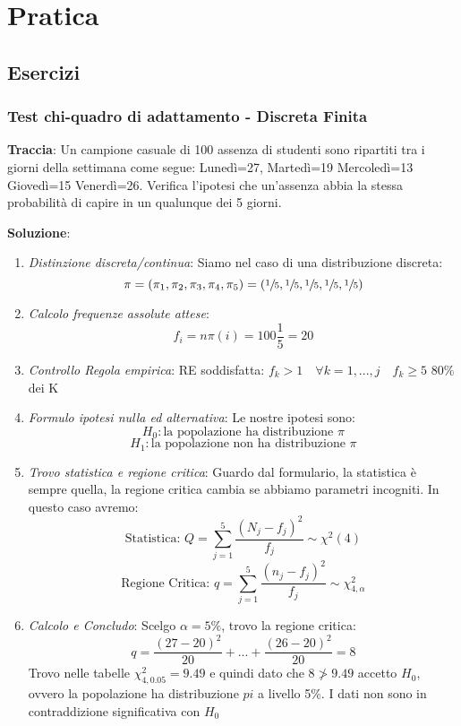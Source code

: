 \section{Pratica}

\subsection{Esercizi}

\subsubsection{Test chi-quadro di adattamento - Discreta Finita}

\textbf{Traccia}: Un campione casuale di 100 assenza di studenti sono ripartiti tra i giorni della settimana come segue: Lunedì=27, Martedì=19 Mercoledì=13 Giovedì=15 Venerdì=26. Verifica l'ipotesi che un'assenza abbia la stessa probabilità di capire in un qualunque dei 5 giorni. \n

\ind \textbf{Soluzione}: 
\begin{enumerate}
    \item \textit{Distinzione discreta/continua}: Siamo nel caso di una distribuzione discreta: $$ \pi = (\pi_1, \pi_2, \pi_3, \pi_4, \pi_5) = (\sfrac{1}{5}, \sfrac{1}{5}, \sfrac{1}{5}, \sfrac{1}{5}, \sfrac{1}{5}) $$
    \item \textit{Calcolo frequenze assolute attese}: $$f_i = n \pi(i) = 100 \frac{1}{5} = 20$$ 
    \item \textit{Controllo Regola empirica}: RE soddisfatta: $f_k > 1 \quad \forall k = 1, ..., j
    \quad f_k \geq 5$ 80\% dei K
    \item \textit{Formulo ipotesi nulla ed alternativa}: Le nostre ipotesi sono: $$H_0: \text{la popolazione ha distribuzione } \pi$$ $$H_1: \text{la popolazione non ha distribuzione }\pi$$
    \item \textit{Trovo statistica e regione critica}: Guardo dal formulario, la statistica è sempre quella, la regione critica cambia se abbiamo parametri incogniti. In questo caso avremo: $$\text{Statistica: } Q = \sum_{j=1}^5 \dfrac{(N_j - f_j)^2}{f_j} \sim \chi^2(4)$$ $$\text{Regione Critica: } q=\sum_{j=1}^5 \dfrac{(n_j - f_j)^2}{f_j} \sim \chi^2_{4, \alpha}  $$
    \item \textit{Calcolo e Concludo}: Scelgo $\alpha=5\%$, trovo la regione critica: $$q = \dfrac{(27 - 20)^2}{20} + ... + \dfrac{(26 - 20)^2}{20} = 8$$ Trovo nelle tabelle $\chi^2_{4, 0.05}=9.49$ e quindi dato che $8 \ngtr 9.49$ accetto $H_0$, ovvero la popolazione ha distribuzione $pi$ a livello 5\%. I dati non sono in contraddizione significativa con $H_0$
    
\end{enumerate}

